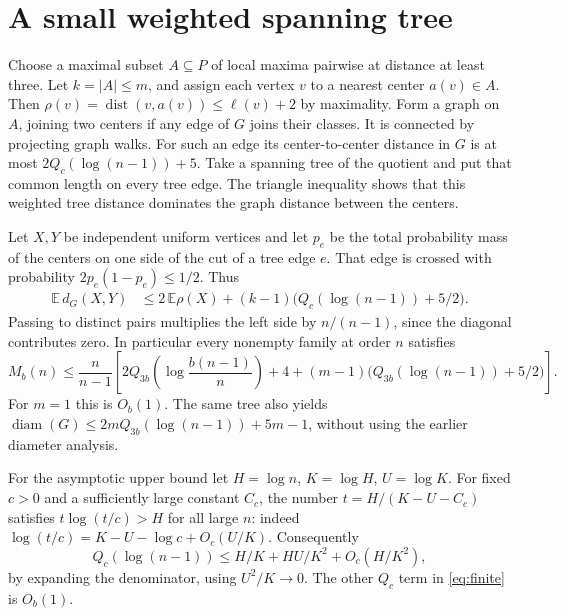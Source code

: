 \documentclass[11pt]{article}
\DeclareMathOperator{\diam}{diam}
\begin{document}
\section{A small weighted spanning tree}
Choose a maximal subset $A\subseteq P$ of local maxima
pairwise at distance at least three. Let $k=|A|\le m$,
and assign each vertex $v$ to a nearest center $a(v)\in A$.
Then $\rho(v)=\operatorname{dist}(v,a(v))\le\ell(v)+2$ by maximality.
Form a graph on $A$, joining two centers if any edge of $G$
joins their classes. It is connected by projecting graph walks.
For such an edge its center-to-center distance in $G$ is
at most $2Q_c(\log(n-1))+5$. Take a spanning tree of
the quotient and put that common length on every tree edge.
The triangle inequality shows that this weighted tree
distance dominates the graph distance between the centers.

Let $X,Y$ be independent uniform vertices and let
$p_e$ be the total probability mass of the centers on one
side of the cut of a tree edge $e$. That edge is crossed
with probability $2p_e(1-p_e)\le1/2$. Thus
\begin{align*}
\mathbb E\,d_G(X,Y)
 &\le 2\,\mathbb E\rho(X)
       +(k-1)\big(Q_c(\log(n-1))+5/2\big).
\end{align*}
Passing to distinct pairs multiplies the left side by
$n/(n-1)$, since the diagonal contributes zero.
In particular every nonempty family at order $n$ satisfies
\begin{equation}\label{eq:finite}
M_b(n)\le\frac n{n-1}\left[
 2Q_{3b}\!\left(\log\frac{b(n-1)}n\right)+4
 +(m-1)\big(Q_{3b}(\log(n-1))+5/2\big)\right].
\end{equation}
For $m=1$ this is $O_b(1)$. The same tree also yields
$\diam(G)\le 2mQ_{3b}(\log(n-1))+5m-1$, without using
the earlier diameter analysis.

For the asymptotic upper bound let $H=\log n$, $K=\log H$,
$U=\log K$. For fixed $c>0$ and a sufficiently large
constant $C_c$, the number $t=H/(K-U-C_c)$ satisfies
$t\log(t/c)>H$ for all large $n$: indeed
$\log(t/c)=K-U-\log c+O_c(U/K)$.
Consequently
\[
 Q_c(\log(n-1))\le H/K+HU/K^2+O_c(H/K^2),
\]
by expanding the denominator, using $U^2/K\to0$.
The other $Q_c$ term in \eqref{eq:finite} is $O_b(1)$.
\end{document}
